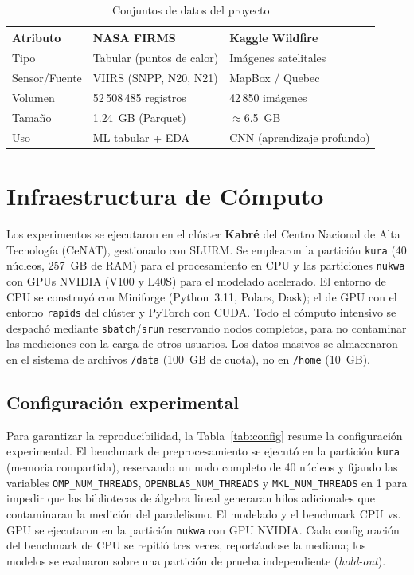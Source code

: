 \documentclass[conference]{IEEEtran}
\begin{document}
\begin{table}[tb]
\caption{Conjuntos de datos del proyecto}
\label{tab:datos}
\centering
\renewcommand{\arraystretch}{1.25}
\begin{tabular}{p{2.0cm} p{2.6cm} p{2.6cm}}
\toprule
\textbf{Atributo} & \textbf{NASA FIRMS} & \textbf{Kaggle Wildfire} \\
\midrule
Tipo & Tabular (puntos de calor) & Imágenes satelitales \\
Sensor/Fuente & VIIRS (SNPP, N20, N21) & MapBox / Quebec \\
Volumen & 52\,508\,485 registros & 42\,850 imágenes \\
Tamaño & 1.24~GB (Parquet) & $\approx$6.5~GB \\
Uso & ML tabular + EDA & CNN (aprendizaje profundo) \\
\bottomrule
\end{tabular}
\end{table}

\section{Infraestructura de Cómputo}
\label{sec:infra}
Los experimentos se ejecutaron en el clúster \textbf{Kabré} del Centro Nacional de Alta Tecnología (CeNAT), gestionado con SLURM. Se emplearon la partición \texttt{kura} (40 núcleos, 257~GB de RAM) para el procesamiento en CPU y las particiones \texttt{nukwa} con GPUs NVIDIA (V100 y L40S) para el modelado acelerado. El entorno de CPU se construyó con Miniforge (Python~3.11, Polars, Dask); el de GPU con el entorno \texttt{rapids} del clúster y PyTorch con CUDA. Todo el cómputo intensivo se despachó mediante \texttt{sbatch}/\texttt{srun} reservando nodos completos, para no contaminar las mediciones con la carga de otros usuarios. Los datos masivos se almacenaron en el sistema de archivos \texttt{/data} (100~GB de cuota), no en \texttt{/home} (10~GB).

\subsection{Configuración experimental}
\label{sec:config}
Para garantizar la reproducibilidad, la Tabla~\ref{tab:config} resume la configuración experimental. El benchmark de preprocesamiento se ejecutó en la partición \texttt{kura} (memoria compartida), reservando un nodo completo de 40 núcleos y fijando las variables \texttt{OMP\_NUM\_THREADS}, \texttt{OPENBLAS\_NUM\_THREADS} y \texttt{MKL\_NUM\_THREADS} en 1 para impedir que las bibliotecas de álgebra lineal generaran hilos adicionales que contaminaran la medición del paralelismo. El modelado y el benchmark CPU vs. GPU se ejecutaron en la partición \texttt{nukwa} con GPU NVIDIA. Cada configuración del benchmark de CPU se repitió tres veces, reportándose la mediana; los modelos se evaluaron sobre una partición de prueba independiente (\textit{hold-out}).
\end{document}
